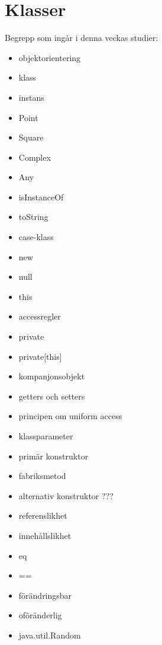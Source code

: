 \chapter{Klasser}\label{chapter:W05}
Begrepp som ingår i denna veckas studier:
\begin{multicols}{2}\begin{itemize}[noitemsep,label={$\square$},leftmargin=*]
\item objektorientering
\item klass
\item instans
\item Point
\item Square
\item Complex
\item Any
\item isInstanceOf
\item toString
\item case-klass
\item new
\item null
\item this
\item accessregler
\item private
\item private[this]
\item kompanjonsobjekt
\item getters och setters
\item principen om uniform access
\item klassparameter
\item primär konstruktor
\item fabriksmetod
\item alternativ konstruktor ???
\item referenslikhet
\item innehållslikhet
\item eq
\item ==
\item förändringsbar
\item oföränderlig
\item java.util.Random\end{itemize}\end{multicols}

